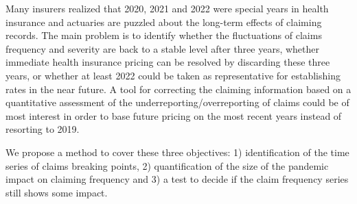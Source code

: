 \documentclass[12pt]{article}
\theoremstyle{definition}
\theoremstyle{remark}
\begin{document}
Many insurers realized that 2020, 2021 and 2022 were special years in health insurance and actuaries are puzzled about the long-term effects of claiming records. The main problem is to identify whether the fluctuations of claims frequency and severity are back to a stable level after three years, whether immediate health insurance pricing can be resolved by discarding these three years, or whether at least 2022 could be taken as representative for establishing rates in the near future. A tool for correcting the claiming information based on a quantitative assessment of the underreporting/overreporting of claims could be of most interest in order to base future pricing on the most recent years instead of resorting to 2019.

We propose a method to cover these three objectives: 1) identification of the time series of claims breaking points, 2) quantification of the size of the pandemic impact on claiming frequency and 3) a test to decide if the claim frequency series still shows some impact. 
\end{document}
